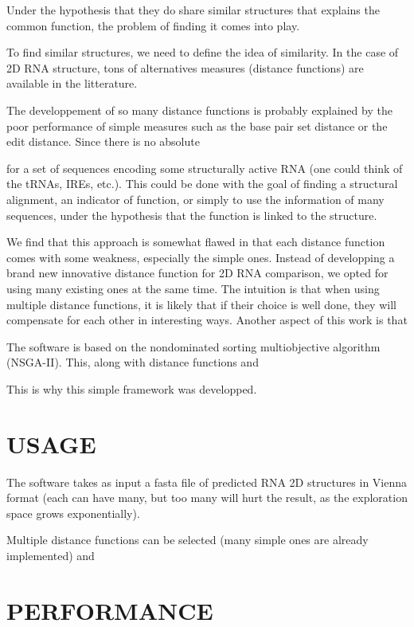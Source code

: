 \documentclass[a4paper, 12pt] {article}
\begin{document}
Under the hypothesis that they do share similar structures that explains the common
function, the problem of finding it comes into play.

To find similar structures, we need to define the idea of similarity. In the case
of 2D RNA structure, tons of alternatives measures (distance functions) are available
in the litterature.

The developpement of so many distance functions is probably explained
by the poor performance of simple measures such as the base pair set distance or the edit
distance. Since there is no absolute 




for a set of sequences encoding some
structurally active RNA (one could think of the tRNAs, IREs, etc.).
This could be done with the goal of finding a structural alignment,
an indicator of function, or simply to use the information of many
sequences, under the hypothesis that the function is linked to the structure.


We find that this approach is somewhat flawed in that each distance function
comes with some weakness, especially the simple ones.
Instead of developping a brand new innovative distance function for 
2D RNA comparison, we opted for using many existing ones at the same time.
The intuition is that when using multiple distance functions, it is likely that
if their choice is well done, they will compensate for each other in 
interesting ways.
Another aspect of this work is that 

The software is based on the nondominated sorting multiobjective algorithm (NSGA-II).
This, along with distance functions and 


This is why this simple framework was developped.

\section*{USAGE}
The software takes as input a fasta file of predicted RNA 2D structures in Vienna format
(each can have many, but too many will hurt the result, as the exploration space grows exponentially).

Multiple distance functions can be selected (many simple ones are already implemented) and


\section*{PERFORMANCE}
\end{document}

